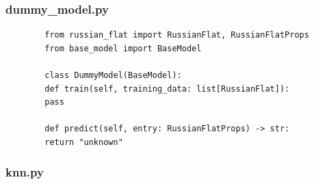 \documentclass[12pt,a4paper]{article}
\begin{document}
	\subsubsection*{dummy\_model.py}
	\begin{lstlisting}
		from russian_flat import RussianFlat, RussianFlatProps
		from base_model import BaseModel
		
		class DummyModel(BaseModel):
		def train(self, training_data: list[RussianFlat]):
		pass
		
		def predict(self, entry: RussianFlatProps) -> str:
		return "unknown"
	\end{lstlisting}
	
	\subsubsection*{knn.py}
\end{document}
